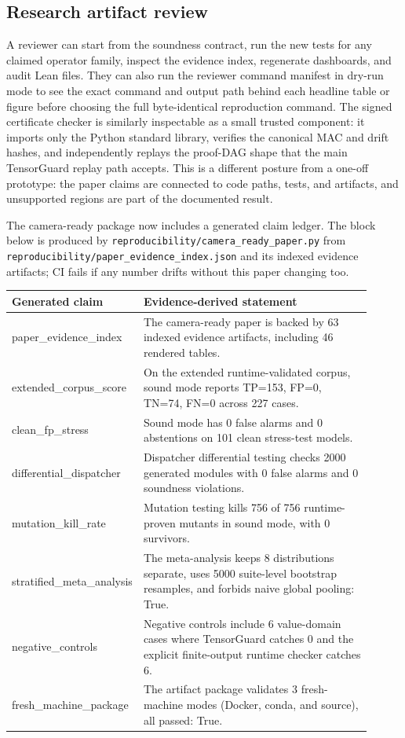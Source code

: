 \documentclass[11pt]{article}
\begin{document}
\subsection{Research artifact review}

A reviewer can start from the soundness contract, run the new tests for any
claimed operator family, inspect the evidence index, regenerate dashboards, and
audit Lean files.  They can also run the reviewer command manifest in dry-run
mode to see the exact command and output path behind each headline table or
figure before choosing the full byte-identical reproduction command.  The signed
certificate checker is similarly inspectable as a small trusted component: it
imports only the Python standard library, verifies the canonical MAC and drift
hashes, and independently replays the proof-DAG shape that the main TensorGuard
replay path accepts.  This is a different posture from a one-off prototype: the
paper claims are connected to code paths, tests, and artifacts, and unsupported
regions are part of the documented result.

The camera-ready package now includes a generated claim ledger.  The block below
is produced by \texttt{reproducibility/camera\_ready\_paper.py} from
\texttt{reproducibility/paper\_evidence\_index.json} and its indexed evidence
artifacts; CI fails if any number drifts without this paper changing too.

\begin{center}
\begin{tabular}{p{0.25\linewidth}p{0.66\linewidth}}
\hline
\textbf{Generated claim} & \textbf{Evidence-derived statement} \\
\hline
paper\_evidence\_index & The camera-ready paper is backed by 63 indexed evidence artifacts, including 46 rendered tables. \\
extended\_corpus\_score & On the extended runtime-validated corpus, sound mode reports TP=153, FP=0, TN=74, FN=0 across 227 cases. \\
clean\_fp\_stress & Sound mode has 0 false alarms and 0 abstentions on 101 clean stress-test models. \\
differential\_dispatcher & Dispatcher differential testing checks 2000 generated modules with 0 false alarms and 0 soundness violations. \\
mutation\_kill\_rate & Mutation testing kills 756 of 756 runtime-proven mutants in sound mode, with 0 survivors. \\
stratified\_meta\_analysis & The meta-analysis keeps 8 distributions separate, uses 5000 suite-level bootstrap resamples, and forbids naive global pooling: True. \\
negative\_controls & Negative controls include 6 value-domain cases where TensorGuard catches 0 and the explicit finite-output runtime checker catches 6. \\
fresh\_machine\_package & The artifact package validates 3 fresh-machine modes (Docker, conda, and source), all passed: True. \\
\hline
\end{tabular}
\end{center}
\end{document}
